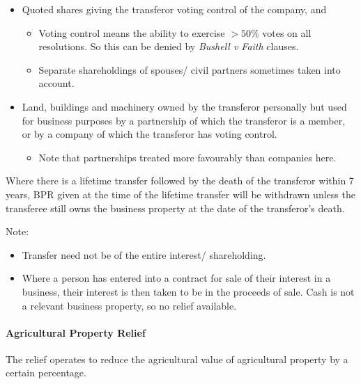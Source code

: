 \documentclass[
]{article}
\providecommand{\tightlist}{%
  \setlength{\itemsep}{0pt}\setlength{\parskip}{0pt}}
\begin{document}
\begin{itemize}
\tightlist
\item
  Quoted shares giving the transferor voting control of the company, and

  \begin{itemize}
  \tightlist
  \item
    Voting control means the ability to exercise \(>50\%\) votes on all
    resolutions. So this can be denied by \emph{Bushell v Faith}
    clauses.
  \item
    Separate shareholdings of spouses/ civil partners sometimes taken
    into account.
  \end{itemize}
\item
  Land, buildings and machinery owned by the transferor personally but
  used for business purposes by a partnership of which the transferor is
  a member, or by a company of which the transferor has voting control.

  \begin{itemize}
  \tightlist
  \item
    Note that partnerships treated more favourably than companies here.
  \end{itemize}
\end{itemize}

Where there is a lifetime transfer followed by the death of the
transferor within 7 years, BPR given at the time of the lifetime
transfer will be withdrawn unless the transferee still owns the business
property at the date of the transferor's death.

Note:

\begin{itemize}
\tightlist
\item
  Transfer need not be of the entire interest/ shareholding.
\item
  Where a person has entered into a contract for sale of their interest
  in a business, their interest is then taken to be in the proceeds of
  sale. Cash is not a relevant business property, so no relief
  available.
\end{itemize}

\hypertarget{agricultural-property-relief}{%
\paragraph{Agricultural Property
Relief}\label{agricultural-property-relief}}

The relief operates to reduce the agricultural value of agricultural
property by a certain percentage.
\end{document}
